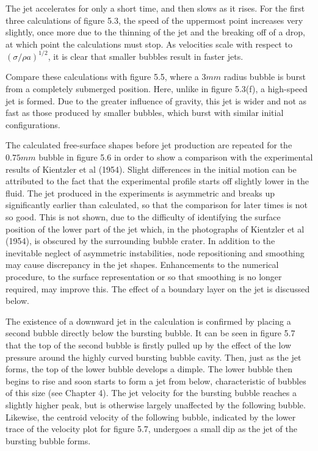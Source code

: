 The jet accelerates for only a short time, and then slows as it rises. For the first
three calculations of figure 5.3, the speed of the uppermost point
increases very slightly, once more due to the thinning of the jet and the breaking off
of a drop, at which point the calculations must stop.
As velocities scale with respect to $(\sigma/\rho a)^{1/2}$,
it is clear that smaller bubbles result in faster jets. 

Compare these calculations with figure 5.5, where a 
$3mm$ radius bubble is burst from a
completely submerged position. Here, unlike in figure 5.3(f),
a high-speed jet is formed. 
Due to the greater influence of gravity, this jet is wider and
not as fast as those produced by smaller bubbles,
which burst with similar initial configurations.

The calculated free-surface shapes before jet production
are repeated for the $0.75mm$ bubble in figure 5.6 in order to show a 
comparison with the experimental results of Kientzler et al (1954). 
Slight differences in the initial motion can be attributed to the fact that the 
experimental profile starts off slightly lower in the fluid.
The jet produced in the experiments is asymmetric and
breaks up significantly earlier than calculated, so that the comparison
for later times is not so good. This is not shown, due to the difficulty
of identifying the surface position of the lower part of the jet which,
in the photographs of Kientzler et al (1954), is obscured by the surrounding
bubble crater. In addition to the inevitable neglect of asymmetric instabilities,
node repositioning and smoothing may cause discrepancy
in the jet shapes.
Enhancements to the numerical
procedure, to the surface representation or so that smoothing is no longer required, 
may improve this. The effect of a boundary layer on the
jet is discussed below.

The existence of a downward jet in the calculation is confirmed by placing 
a second bubble directly below the bursting bubble. 
It can be seen in figure 5.7 that
the top of the second bubble is firstly pulled up 
by the effect of the low pressure
around the highly curved bursting bubble cavity. 
Then, just as the jet forms, the 
top of the lower bubble develops a dimple. 
The lower bubble then begins to rise
and soon starts to form a jet from below, characteristic
of bubbles of this size (see Chapter 4).
 The jet velocity for the bursting bubble reaches a slightly higher
peak, but is otherwise largely unaffected by the following bubble.
Likewise, the centroid velocity of the following bubble, indicated by the 
lower trace of the velocity plot for figure 5.7, undergoes a small dip as the 
jet of the bursting bubble forms.

